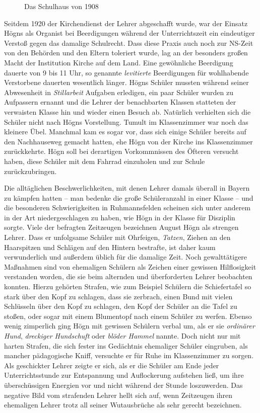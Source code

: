 \begin{figure}
\caption{Das Schulhaus von 1908}
\end{figure}

Seitdem 1920 der Kirchendienst der Lehrer abgeschafft wurde, war der
Einsatz Högns als Organist bei Beerdigungen während der Unterrichtszeit
ein eindeutiger Verstoß gegen das damalige Schulrecht. Dass diese
Praxis auch noch zur NS-Zeit von den Behörden und den Eltern toleriert
wurde, lag an der besonders großen Macht der Institution Kirche auf dem
Land. Eine gewöhnliche Beerdigung dauerte von 9 bis 11 Uhr, so
genannte \textit{levitierte} Beerdigungen für wohlhabende Verstorbene
dauerten wesentlich länger. Högns Schüler mussten während seiner
Abwesenheit in \textit{Stillarbeit} Aufgaben erledigen, ein paar
Schüler wurden zu Aufpassern ernannt und die Lehrer der benachbarten
Klassen statteten der verwaisten Klasse hin und wieder einen Besuch
ab. Natürlich verhielten sich die Schüler nicht nach Högns Vorstellung.
Tumult im Klassenzimmer war noch das kleinere Übel. Manchmal kam es
sogar vor, dass sich einige Schüler bereits auf den Nachhauseweg
gemacht hatten, ehe Högn von der Kirche ins Klassenzimmer zurückkehrte.
Högn soll bei derartigen Vorkommnissen des Öfteren versucht haben,
diese Schüler mit dem Fahrrad einzuholen und zur Schule
zurückzubringen.

Die alltäglichen Beschwerlichkeiten, mit denen Lehrer damals überall in
Bayern zu kämpfen hatten – man bedenke die große Schüleranzahl in einer
Klasse – und die besonderen Schwierigkeiten in Ruhmannsfelden scheinen
sich unter anderem in der Art niedergeschlagen zu haben, wie Högn in
der Klasse für Disziplin sorgte. Viele der befragten Zeitzeugen
bezeichnen August Högn als strengen Lehrer. Dass er unfolgsame Schüler
mit Ohrfeigen, \textit{Tatzen}, Ziehen an den Haarspitzen und Schlägen
auf den Hintern bestrafte, ist daher kaum verwunderlich und außerdem
üblich für die damalige Zeit. Noch gewalttätigere Maßnahmen sind von
ehemaligen Schülern als Zeichen einer gewissen Hilflosigkeit verstanden
worden, die sie beim alternden und überforderten Lehrer beobachten
konnten. Hierzu gehörten Strafen, wie zum Beispiel Schülern die
Schiefertafel so stark über den Kopf zu schlagen, dass sie zerbrach,
einen Bund mit vielen Schlüsseln über den Kopf zu schlagen, den Kopf
der Schüler an die Tafel zu stoßen, oder sogar mit einem Blumentopf
nach einem Schüler zu werfen. Ebenso wenig zimperlich ging Högn mit
gewissen Schülern verbal um, als er sie \textit{ordinärer Hund},
\textit{dreckiger Hundschuft} oder \textit{blöder Hammel} nannte. Doch
nicht nur mit harten Strafen, die sich fester ins Gedächtnis ehemaliger
Schüler eingruben, als mancher pädagogische Kniff, versuchte er für
Ruhe im Klassenzimmer zu sorgen. Als geschickter Lehrer zeigte er sich,
als er die Schüler am Ende jeder Unterrichtsstunde zur Entspannung und
Auflockerung aufstehen ließ, um ihre überschüssigen Energien vor und
nicht während der Stunde loszuwerden. Das negative Bild vom strafenden
Lehrer hellt sich auf, wenn Zeitzeugen ihren ehemaligen Lehrer trotz
all seiner Wutausbrüche als sehr gerecht bezeichnen.

